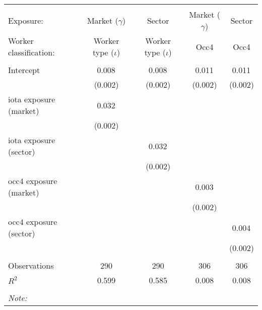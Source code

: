 \begin{tabular}{@{\extracolsep{5pt}}lcccc}
\\[-1.8ex]\hline
\hline \\[-1.8ex]
\hline \\[-1.8ex]
 Exposure: & Market ($\gamma$) & Sector & Market ($\gamma$) & Sector \\
 Worker classification: & Worker type ($\iota$) & Worker type ($\iota$) & Occ4 & Occ4 \\
 \hline &  &  &  &  \\
 Intercept & 0.008$^{}$ & 0.008$^{}$ & 0.011$^{}$ & 0.011$^{}$ \\
  & (0.002) & (0.002) & (0.002) & (0.002) \\
 iota exposure (market) & 0.032$^{}$ & & & \\
  & (0.002) & & & \\
 iota exposure (sector) & & 0.032$^{}$ & & \\
  & & (0.002) & & \\
 occ4 exposure (market) & & & 0.003$^{}$ & \\
  & & & (0.002) & \\
 occ4 exposure (sector) & & & & 0.004$^{}$ \\
  & & & & (0.002) \\
\hline \\[-1.8ex]
 Observations & 290 & 290 & 306 & 306 \\
 $R^2$ & 0.599 & 0.585 & 0.008 & 0.008 \\
\hline
\hline \\[-1.8ex]
\textit{Note:}\end{tabular}